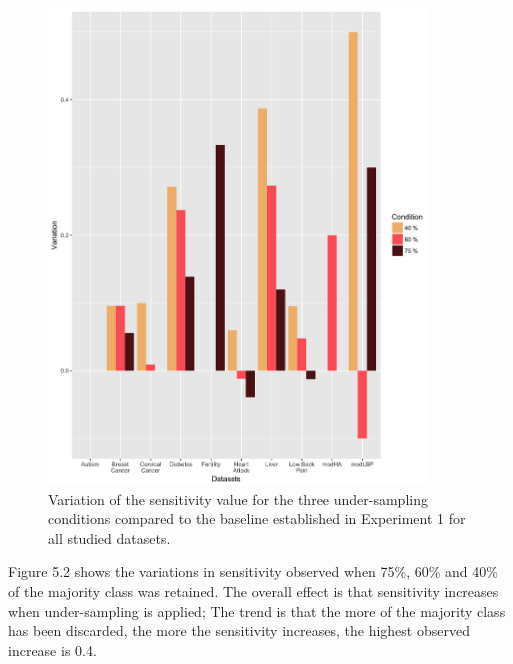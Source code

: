 \begin{figure}[!htbp]
    \centering
    \includegraphics[width=0.9\textwidth]{ThesisTemplate/usingLatex/chapter5Images/SensiVariationUnderBySets.png}
    \caption{Variation of the sensitivity value for the three under-sampling conditions compared to the baseline established in Experiment 1 for all studied datasets.}
    \label{fig:my_label}
\end{figure}
Figure 5.2 shows the variations in sensitivity observed when   75\%, 60\% and 40\% of the majority class was retained. The overall effect is that sensitivity increases when under-sampling is applied; The trend is that the more of the majority class has been discarded, the more the sensitivity increases, the highest observed increase is 0.4.\newline



